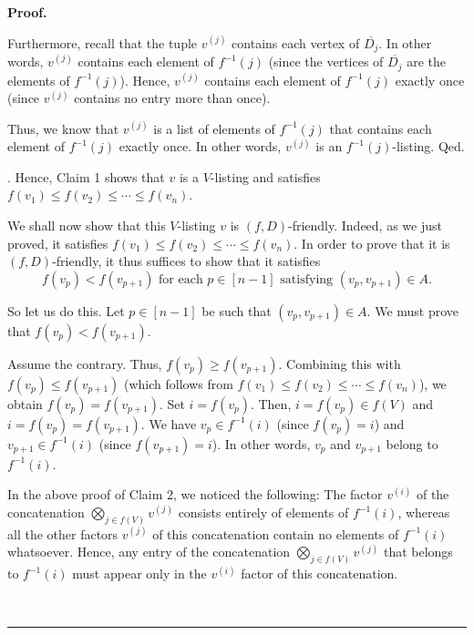 \documentclass[numbers=enddot,12pt,final,onecolumn,notitlepage]{scrartcl}%
\numberwithin{exer}{section}
\theoremstyle{definition}
\newenvironment{proof}[1][Proof]{\noindent\textbf{#1.} }{\ \rule{0.5em}{0.5em}}
\newenvironment{verlong}{}{}
\begin{document}
\begin{verlong}
\begin{proof}
{\par
Furthermore, recall that the tuple $v^{\left(  j\right)  }$ contains each
vertex of $\overline{D_{j}}$. In other words, $v^{\left(  j\right)  }$
contains each element of $f^{-1}\left(  j\right)  $ (since the vertices of
$\overline{D_{j}}$ are the elements of $f^{-1}\left(  j\right)  $). Hence,
$v^{\left(  j\right)  }$ contains each element of $f^{-1}\left(  j\right)  $
exactly once (since $v^{\left(  j\right)  }$ contains no entry more than
once).
\par
Thus, we know that $v^{\left(  j\right)  }$ is a list of elements of
$f^{-1}\left(  j\right)  $ that contains each element of $f^{-1}\left(
j\right)  $ exactly once. In other words, $v^{\left(  j\right)  }$ is an
$f^{-1}\left(  j\right)  $-listing. Qed.}. Hence, Claim 1 shows that $v$ is a
$V$-listing and satisfies $f\left(  v_{1}\right)  \leq f\left(  v_{2}\right)
\leq\cdots\leq f\left(  v_{n}\right)  $.

We shall now show that this $V$-listing $v$ is $\left(  f,D\right)
$-friendly. Indeed, as we just proved, it satisfies $f\left(  v_{1}\right)
\leq f\left(  v_{2}\right)  \leq\cdots\leq f\left(  v_{n}\right)  $. In order
to prove that it is $\left(  f,D\right)  $-friendly, it thus suffices to show
that it satisfies%
\[
f\left(  v_{p}\right)  <f\left(  v_{p+1}\right)  \text{ for each }p\in\left[
n-1\right]  \text{ satisfying }\left(  v_{p},v_{p+1}\right)  \in A.
\]


So let us do this. Let $p\in\left[  n-1\right]  $ be such that $\left(
v_{p},v_{p+1}\right)  \in A$. We must prove that $f\left(  v_{p}\right)
<f\left(  v_{p+1}\right)  $.

Assume the contrary. Thus, $f\left(  v_{p}\right)  \geq f\left(
v_{p+1}\right)  $. Combining this with $f\left(  v_{p}\right)  \leq f\left(
v_{p+1}\right)  $ (which follows from $f\left(  v_{1}\right)  \leq f\left(
v_{2}\right)  \leq\cdots\leq f\left(  v_{n}\right)  $), we obtain $f\left(
v_{p}\right)  =f\left(  v_{p+1}\right)  $. Set $i=f\left(  v_{p}\right)  $.
Then, $i=f\left(  v_{p}\right)  \in f\left(  V\right)  $ and $i=f\left(
v_{p}\right)  =f\left(  v_{p+1}\right)  $. We have $v_{p}\in f^{-1}\left(
i\right)  $ (since $f\left(  v_{p}\right)  =i$) and $v_{p+1}\in f^{-1}\left(
i\right)  $ (since $f\left(  v_{p+1}\right)  =i$). In other words, $v_{p}$ and
$v_{p+1}$ belong to $f^{-1}\left(  i\right)  $.

In the above proof of Claim 2, we noticed the following: The factor
$v^{\left(  i\right)  }$ of the concatenation $\bigotimes\limits_{j\in
f\left(  V\right)  }v^{\left(  j\right)  }$ consists entirely of elements of
$f^{-1}\left(  i\right)  $, whereas all the other factors $v^{\left(
j\right)  }$ of this concatenation contain no elements of $f^{-1}\left(
i\right)  $ whatsoever. Hence, any entry of the concatenation $\bigotimes
\limits_{j\in f\left(  V\right)  }v^{\left(  j\right)  }$ that belongs to
$f^{-1}\left(  i\right)  $ must appear only in the $v^{\left(  i\right)  }$
factor of this concatenation.


\end{proof}
\end{verlong}
\end{document}
